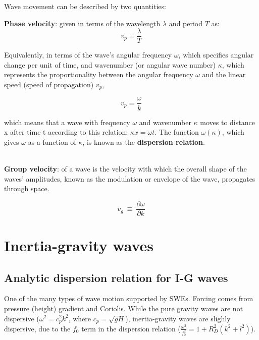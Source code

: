 Wave movement can be described by two quantities:

{\bf Phase velocity}: given in terms of the wavelength $\lambda$ and period $T$ as:
\begin{equation}
	v_{p} ={\frac {\lambda }{T}} 
\end{equation}

Equivalently, in terms of the wave's angular frequency $\omega$, which specifies angular change per unit of time, and wavenumber (or angular wave number) $\kappa$, which represents the proportionality between the angular frequency $\omega$ and the linear speed (speed of propagation) $v_p$,

\begin{equation}
	v_{p}={\frac {\omega }{k}}
\end{equation}

which means that a wave with frequency $\omega$ and wavenumber $\kappa$ moves to distance x after time t according to this relation: $\kappa x = \omega t$. The function $\omega(\kappa)$, which gives $\omega$ as a function of $\kappa$, is known as the \textbf{dispersion relation}. \\
~
~

{\bf Group velocity}: of a wave is the velocity with which the overall shape of the waves' amplitudes, known as the modulation or envelope of the wave, propagates through space.

\begin{equation}
	v_{g}\ \equiv \ {\frac {\partial \omega }{\partial k}}
\end{equation}



\section{Inertia-gravity waves}
\subsection{Analytic dispersion relation for I-G waves}

One of the many types of wave motion supported by SWEs. Forcing comes from pressure (height) gradient and Coriolis. While the pure gravity waves are not dispersive ($\omega^2 = c_p^2 k^2$, where $c_p=\sqrt{gH}$), inertia-gravity waves are slighly dispersive, due to the $f_0$ term in the dispersion relation ($\frac{\omega^2} {f_0^2}=1 + R_D^2\left(k^2+l^2\right)$).

